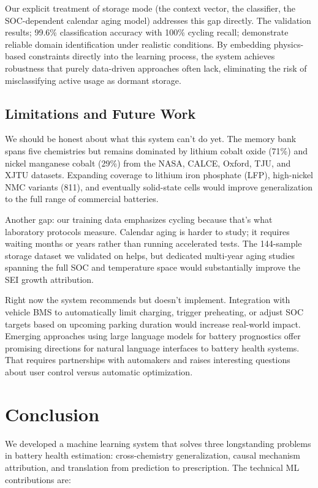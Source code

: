 \documentclass[5p,times,authoryear]{elsarticle}
\begin{document}
Our explicit treatment of storage mode (the context vector, the classifier, the SOC-dependent calendar aging model) addresses this gap directly. The validation results; 99.6\% classification accuracy with 100\% cycling recall; demonstrate reliable domain identification under realistic conditions. By embedding physics-based constraints directly into the learning process, the system achieves robustness that purely data-driven approaches often lack, eliminating the risk of misclassifying active usage as dormant storage.


\subsection{Limitations and Future Work}

We should be honest about what this system can't do yet. The memory bank spans five chemistries but remains dominated by lithium cobalt oxide (71\%) and nickel manganese cobalt (29\%) from the NASA, CALCE, Oxford, TJU, and XJTU datasets. Expanding coverage to lithium iron phosphate (LFP), high-nickel NMC variants (811), and eventually solid-state cells would improve generalization to the full range of commercial batteries.

Another gap: our training data emphasizes cycling because that's what laboratory protocols measure. Calendar aging is harder to study; it requires waiting months or years rather than running accelerated tests. The 144-sample storage dataset we validated on helps, but dedicated multi-year aging studies spanning the full SOC and temperature space would substantially improve the SEI growth attribution.

Right now the system recommends but doesn't implement. Integration with vehicle BMS to automatically limit charging, trigger preheating, or adjust SOC targets based on upcoming parking duration would increase real-world impact. Emerging approaches using large language models for battery prognostics \citep{zhao2026llm} offer promising directions for natural language interfaces to battery health systems. That requires partnerships with automakers and raises interesting questions about user control versus automatic optimization.

\section{Conclusion}

We developed a machine learning system that solves three longstanding problems in battery health estimation: cross-chemistry generalization, causal mechanism attribution, and translation from prediction to prescription. The technical ML contributions are:
\end{document}
